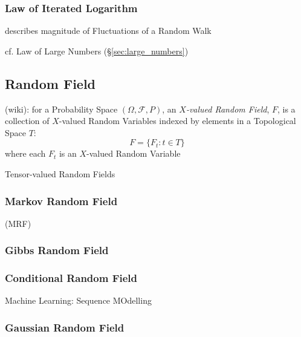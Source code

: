\subsubsection{Law of Iterated Logarithm}\label{sec:iterated_logarithm}

describes magnitude of Fluctuations of a Random Walk

cf. Law of Large Numbers (\S\ref{sec:large_numbers})



\subsection{Random Field}\label{sec:random_field}

(wiki): for a Probability Space $(\Omega, \mathcal{F}, P)$, an \emph{$X$-valued
  Random Field}, $F$, is a collection of $X$-valued Random Variables indexed by
elements in a Topological Space $T$:
\[
  F = \{ F_t : t \in T \}
\]
where each $F_t$ is an $X$-valued Random Variable

Tensor-valued Random Fields



\subsubsection{Markov Random Field}\label{sec:markov_random_field}

(MRF)



\subsubsection{Gibbs Random Field}\label{sec:gibbs_random_field}

\subsubsection{Conditional Random Field}\label{sec:conditional_random_field}

Machine Learning: Sequence MOdelling



\subsubsection{Gaussian Random Field}\label{sec:gaussian_random_field}

